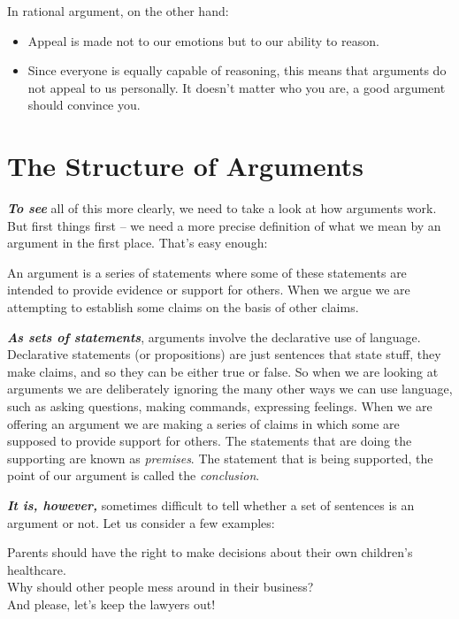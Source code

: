 \documentclass[12pt, openany]{book}
\makeatletter
\newenvironment{kframe}{%
\medskip{}
\setlength{\fboxsep}{.8em}
 \def\at@end@of@kframe{}%
 \ifinner\ifhmode%
  \def\at@end@of@kframe{\end{minipage}}%
  \begin{minipage}{\columnwidth}%
 \fi\fi%
 \def\FrameCommand##1{\hskip\@totalleftmargin \hskip-\fboxsep
 \colorbox{shadecolor}{##1}\hskip-\fboxsep
     \hskip-\linewidth \hskip-\@totalleftmargin \hskip\columnwidth}%
 \MakeFramed {\advance\hsize-\width
   \@totalleftmargin\z@ \linewidth\hsize
   \@setminipage}}%
 {\par\unskip\endMakeFramed%
 \at@end@of@kframe}
\newenvironment{rmdblock}[1]
  {
  \begin{itemize}
  \renewcommand{\labelitemi}{
    \raisebox{-.7\height}[0pt][0pt]{
      {\setkeys{Gin}{width=3em,keepaspectratio}\texttt{[image: img/\#1]}}
    }
  }
  \setlength{\fboxsep}{1em}
  \begin{kframe}
  \item
  }
  {
  \end{kframe}
  \end{itemize}
  }
\newenvironment{note}
  {\begin{rmdblock}{note}}
  {\end{rmdblock}}
\makeatother
\begin{document}
In rational argument, on the other hand:

\begin{itemize}
\item
  Appeal is made not to our emotions but to our ability to reason.
\item
  Since everyone is equally capable of reasoning, this means that arguments do not appeal to us personally. It doesn't matter who you are, a good argument should convince you.
\end{itemize}

\hypertarget{the-structure-of-arguments}{%
\section{The Structure of Arguments}\label{the-structure-of-arguments}}

\textbf{\emph{To see}} all of this more clearly, we need to take a look at how arguments work. But first things first -- we need a more precise definition of what we mean by an argument in the first place. That's easy enough:

\begin{note}

An argument is a series of statements where some of these statements are intended to provide evidence or support for others. When we argue we are attempting to establish some claims on the basis of other claims.

\end{note}

\textbf{\emph{As sets of statements}}, arguments involve the declarative use of language. Declarative statements (or propositions) are just sentences that state stuff, they make claims, and so they can be either true or false. So when we are looking at arguments we are deliberately ignoring the many other ways we can use language, such as asking questions, making commands, expressing feelings. When we are offering an argument we are making a series of claims in which some are supposed to provide support for others. The statements that are doing the supporting are known as \emph{premises}. The statement that is being supported, the point of our argument is called the \emph{conclusion}.

\textbf{\emph{It is, however,}} sometimes difficult to tell whether a set of sentences is an argument or not. Let us consider a few examples:

\begin{center}

\begin{argument}

Parents should have the right to make decisions about their own children's healthcare.\\
Why should other people mess around in their business?\\
And please, let's keep the lawyers out!

\end{argument}

\end{center}
\end{document}
